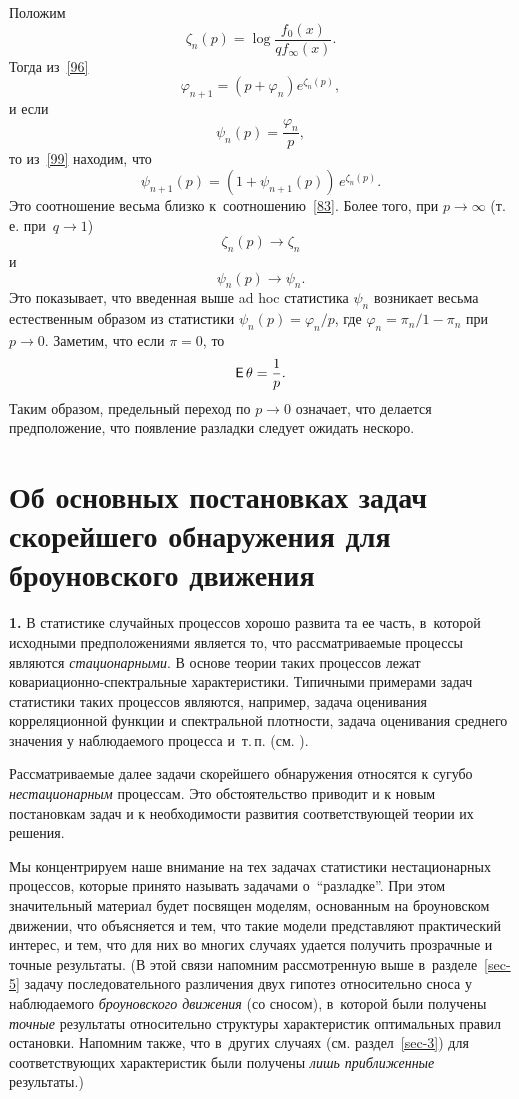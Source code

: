 Положим
\begin{equation}
\label{98}%
    \zeta_n(p)=\log\frac{f_0(x)}{qf_{\infty}(x)}.
\end{equation}
Тогда из~\eqref{96}
\begin{equation}
\label{99}%
    \varphi_{n+1}=(p+\varphi_n)e^{\zeta_n(p)},
\end{equation}
и если
\begin{equation}
\label{100}%
    \psi_n(p)=\frac{\varphi_n}{p},
\end{equation}
то из~\eqref{99} находим, что
\begin{equation}
\label{101}%
    \psi_{n+1}(p)=(1+\psi_{n+1}(p))\,e^{\zeta_n(p)}.
\end{equation}
Это соотношение весьма близко к~соотношению~\eqref{83}. Более
того, при $p\to\infty$ (т.\,е. при~$q\to1$)
\[
\zeta_n(p)\to\zeta_n
\]
и
\[
\psi_n(p)\to\psi_n.
\]
Это показывает, что введенная выше ad hoc статистика $\psi_n$
возникает весьма естественным образом из статистики
$\psi_n(p)=\varphi_n/p$, где $\varphi_n=\pi_n/1-\pi_n$ при
$p\to0$. Заметим, что если $\pi=0$, то
\[
\E\theta=\frac{1}{p}.
\]
Таким образом, предельный переход по $p\to0$ означает, что
делается предположение, что появление разладки следует ожидать
нескоро.

\section{Об основных постановках задач скорейшего обнаружения для 
броуновского движения}\label{sec-6}

\textbf{1.} В статистике случайных процессов хорошо развита та ее
часть, в~которой исходными предположениями является то, что
рассматриваемые процессы являются \textit{стационарными}. В основе
теории таких процессов лежат ковариационно-спектральные
характеристики. Типичными примерами задач статистики таких
процессов являются, например, задача оценивания корреляционной
функции и спектральной плотности, задача оценивания среднего
значения у наблюдаемого процесса и~т.\,п. (см. \cite[гл.~VI,
\S\,4]{11}).

Рассматриваемые далее задачи скорейшего обнаружения относятся к
сугубо \textit{нестационарным} процессам. Это обстоятельство
приводит и к новым постановкам задач и к необходимости развития
соответствующей теории их решения.

Мы концентрируем наше внимание на тех задачах статистики
нестационарных процессов, которые принято называть задачами
о~``разладке''. При этом значительный материал будет посвящен
моделям, основанным на броуновском движении, что объясняется и
тем, что такие модели представляют практический интерес, и тем,
что для них во многих случаях удается получить прозрачные и точные
результаты. (В этой связи напомним рассмотренную выше
в~разделе~\ref{sec-5} задачу последовательного различения двух
гипотез относительно сноса у наблюдаемого \textit{броуновского
	движения} (со сносом), в~которой были получены \textit{точные}
результаты относительно структуры характеристик оптимальных правил
остановки. Напомним также, что в~других случаях (см.
раздел~\ref{sec-3}) для соответствующих характеристик были
получены \textit{лишь приближенные} результаты.)


